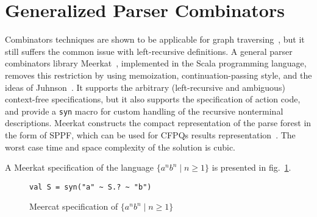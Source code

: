 \section{Generalized Parser Combinators}
\label{sec:GLL}

Combinators techniques are shown to be applicable for graph traversing~\cite{ScalaGraphParsing}, but it still suffers the common issue with left-recursive definitions.
A general parser combinators library Meerkat~\cite{Meerkat}, implemented in the Scala programming language, removes this restriction by using memoization, continuation-passing style, and the ideas of Juhnson~\cite{Johnson}.
It supports the arbitrary (left-recursive and ambiguous) context-free specifications, but it also supports the specification of action code, and provide a \lstinline{syn} macro for custom handling of the recursive nonterminal descriptions.
Meerkat constructs the compact representation of the parse forest in the form of SPPF, which can be used for CFPQs results representation~\cite{GrigorevR16}.
The worst case time and space complexity of the solution is cubic.


A Meerkat specification of the language $\{a^n b^n \mid n \geq 1\}$ is presented in fig.~\ref{fig:anbnMeerkat}.


\begin{figure}[h]
\begin{lstlisting}
val S = syn("a" ~ S.? ~ "b")
\end{lstlisting}
\caption{Meercat specification of $\{a^n b^n \mid n \geq 1\}$}
\label{fig:anbnMeerkat}
\end{figure}


